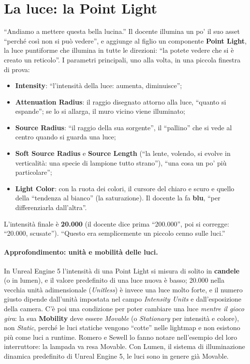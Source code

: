 \section{La luce: la Point Light}
\label{ue7:sec:luce}

``Andiamo a mettere questa bella lucina.'' Il docente illumina un po' il suo asset ``perché
così non si può vedere'', e aggiunge al figlio un componente \textbf{Point Light}, la luce
puntiforme che illumina in tutte le direzioni: ``la potete vedere che si è creato un
reticolo''. I parametri principali, uno alla volta, in una piccola finestra di prova:
\begin{itemize}
  \item \textbf{Intensity}: ``l'intensità della luce: aumenta, diminuisce'';
  \item \textbf{Attenuation Radius}: il raggio disegnato attorno alla luce, ``quanto si
        espande''; se lo si allarga, il muro vicino viene illuminato;
  \item \textbf{Source Radius}: ``il raggio della sua sorgente'', il ``pallino'' che si
        vede al centro quando si guarda una luce;
  \item \textbf{Soft Source Radius} e \textbf{Source Length} (``la lente, volendo, si
        evolve in verticalità: una specie di lampione tutto strano''), ``una cosa un po'
        più particolare'';
  \item \textbf{Light Color}: con la ruota dei colori, il cursore del chiaro e scuro e
        quello della ``tendenza al bianco'' (la saturazione). Il docente la fa
        \textbf{blu}, ``per differenziarla dall'altra''.
\end{itemize}
L'intensità finale è \textbf{20.000} (il docente dice prima ``200.000'', poi si
corregge: ``20.000, scusate''). ``Questo era semplicemente un piccolo cenno sulle
luci.''

\paragraph{Approfondimento: unità e mobilità delle luci.} In Unreal Engine 5 l'intensità
di una Point Light si misura di solito in \textbf{candele} (o in lumen), e il valore
predefinito di una luce nuova è basso; 20.000 nella vecchia unità adimensionale
(\emph{Unitless}) è invece una luce molto forte, e il numero giusto dipende dall'unità
impostata nel campo \emph{Intensity Units} e dall'esposizione della camera. C'è poi una
condizione per poter cambiare una luce \emph{mentre il gioco gira}: la sua
\textbf{Mobility} deve essere \emph{Movable} (o \emph{Stationary} per intensità e
colore), non \emph{Static}, perché le luci statiche vengono ``cotte'' nelle lightmap e
non esistono più come luci a runtime. Romero e Sewell lo fanno notare nell'esempio del
loro interruttore: la lampada va resa Movable. Con Lumen, il sistema di illuminazione
dinamica predefinito di Unreal Engine 5, le luci sono in genere già Movable.

